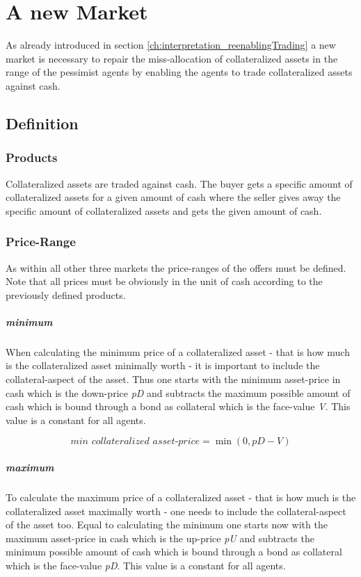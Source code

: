\documentclass[Bachelorarbeit.tex]{subfiles}
\begin{document}
\graphicspath{{./figures/newMarket/}}	%

\chapter{A new Market}
\label{ch:newMarket}
As already introduced in section \ref{ch:interpretation_reenablingTrading} a new market is necessary to repair the miss-allocation of collateralized assets in the range of the pessimist agents by enabling the agents to trade collateralized assets against cash.

\section{Definition}
\subsection{Products}
Collateralized assets are traded against cash. The buyer gets a specific amount of collateralized assets for a given amount of cash where the seller gives away the specific amount of collateralized assets and gets the given amount of cash.

\subsection{Price-Range}
As within all other three markets the price-ranges of the offers must be defined. Note that all prices must be obviously in the unit of cash according to the previously defined products.

\paragraph{minimum}
When calculating the minimum price of a collateralized asset - that is how much is the collateralized asset minimally worth - it is important to include the collateral-aspect of the asset. Thus one starts with the minimum asset-price in cash which is the down-price \textit{pD} and subtracts the maximum possible amount of cash which is bound through a bond as collateral which is the face-value \textit{V}. This value is a constant for all agents.

\begin{equation}
\textit{min collateralized asset-price} = \min(0, \textit{pD} - \textit{V})
\end{equation}
 
\paragraph{maximum}
To calculate the maximum price of a collateralized asset - that is how much is the collateralized asset maximally worth - one needs to include the collateral-aspect of the asset too. Equal to calculating the minimum one starts now with the maximum asset-price in cash which is the up-price \textit{pU} and subtracts the minimum possible amount of cash which is bound through a bond as collateral which is the face-value \textit{pD}. This value is a constant for all agents.
\end{document}
